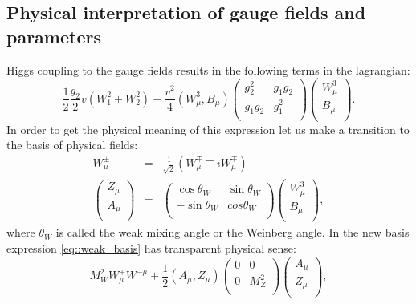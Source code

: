 \subsection{Physical interpretation of gauge fields and parameters}
Higgs coupling to the gauge fields results in the following terms in the lagrangian:
\begin{equation}
\label{eq::weak_basis}
\frac{1}{2}\frac{g_2}{2}v(W_1^2+W^2_2)+\frac{v^2}{4}(W^3_{\mu},B_{\mu}) \begin{pmatrix}
g_2^2  & g_1 g_2 \\
g_1 g_2 & g_1^2   \\
\end{pmatrix}
\begin{pmatrix}
W^3_{\mu} \\
B_{\mu}   \\
\end{pmatrix}.
\end{equation}
In order to get the physical meaning of this expression let us make a transition to the basis of physical fields:
\begin{equation}
\begin{array}{lcl} 
W^{\pm}_{\mu}  &=& \frac{1}{\sqrt{2}}(W^{\mp}_{\mu}\mp iW^{\mp}_{\mu})\\ 
\begin{pmatrix} Z_{\mu} \\ A_{\mu}   \\ \end{pmatrix}  &=& \begin{pmatrix} \cos{\theta_{W}} & \sin{\theta_{W}}\\ -\sin{\theta_{W}}& cos{\theta_{W}}   \\ \end{pmatrix} \begin{pmatrix} W^3_{\mu} \\ B_{\mu}   \\ \end{pmatrix},
\end{array} 
\end{equation}
where $\theta_{W}$ is called the weak mixing angle or the Weinberg angle. In the new basis expression \ref{eq::weak_basis} has transparent physical sense:
\begin{equation}
M^2_W W^+_{\mu}W^{-\mu} +\frac{1}{2} (A_{\mu},Z_{\mu})\begin{pmatrix}
0 & 0 \\
0 & M^2_Z   \\
\end{pmatrix}
\begin{pmatrix}
A_{\mu} \\
Z_{\mu}   \\
\end{pmatrix},
\end{equation}
